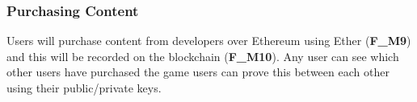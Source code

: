 \subsubsection*{Purchasing Content}

Users will purchase content from developers over Ethereum using Ether (\textbf{F\_M9}) and this will be recorded on the blockchain (\textbf{F\_M10}). Any user can see which other users have purchased the game users can prove this between each other using their public/private keys.
